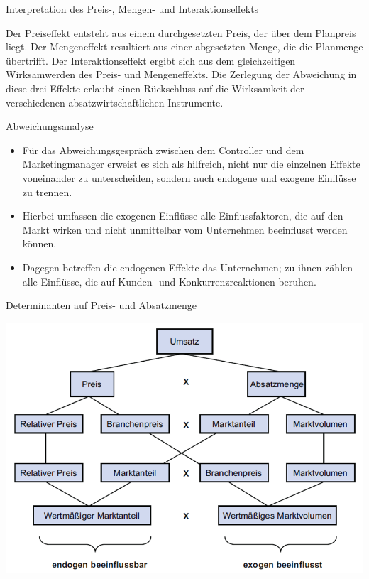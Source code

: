 \documentclass[12pt,ngerman,a4paper,ignorenonframetext,]{beamer}
\providecommand{\tightlist}{%
  \setlength{\itemsep}{0pt}\setlength{\parskip}{0pt}}
\begin{document}
\begin{frame}{Interpretation des Preis-, Mengen- und
Interaktionseffekts}
\protect\hypertarget{interpretation-des-preis--mengen--und-interaktionseffekts}{}

Der Preiseffekt entsteht aus einem durchgesetzten Preis, der über dem
Planpreis liegt. Der Mengeneffekt resultiert aus einer abgesetzten
Menge, die die Planmenge übertrifft. Der Interaktionseffekt ergibt sich
aus dem gleichzeitigen Wirksamwerden des Preis- und Mengeneffekts. Die
Zerlegung der Abweichung in diese drei Effekte erlaubt einen Rückschluss
auf die Wirksamkeit der verschiedenen absatzwirtschaftlichen
Instrumente.

\end{frame}

\begin{frame}{Abweichungsanalyse}
\protect\hypertarget{abweichungsanalyse}{}

\begin{itemize}
\tightlist
\item
  Für das Abweichungsgespräch zwischen dem Controller und dem
  Marketingmanager erweist es sich als hilfreich, nicht nur die
  einzelnen Effekte voneinander zu unterscheiden, sondern auch endogene
  und exogene Einflüsse zu trennen.
\item
  Hierbei umfassen die exogenen Einflüsse alle Einflussfaktoren, die auf
  den Markt wirken und nicht unmittelbar vom Unternehmen beeinflusst
  werden können.
\item
  Dagegen betreffen die endogenen Effekte das Unternehmen; zu ihnen
  zählen alle Einflüsse, die auf Kunden- und Konkurrenzreaktionen
  beruhen.
\end{itemize}

\end{frame}

\begin{frame}{Determinanten auf Preis- und Absatzmenge}
\protect\hypertarget{determinanten-auf-preis--und-absatzmenge}{}

\begin{center}\includegraphics[width=0.7\linewidth]{./images/Marketingcontrolling/Abweichungsanalyse2} \end{center}

\end{frame}
\end{document}
